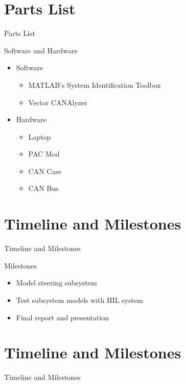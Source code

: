 \documentclass{beamer}
\begin{document}
\section{Parts List}

\begin{frame}{Parts List}
  \begin{block}{Software and Hardware}
 \begin{itemize}
        \item Software
        \begin{itemize}
        \small
        \item MATLAB's System Identification Toolbox
        \item Vector CANAlyzer
        \end{itemize}
	\item Hardware
	\begin{itemize}
	\small
	\item Laptop
	\item PAC Mod
	\item CAN Case 
	\item CAN Bus
	\end{itemize}
\end{itemize}
  \end{block}
\end{frame}

\section{Timeline and Milestones}

\begin{frame}{Timeline and Milestones}
  \begin{block}{Milestones}
 \begin{itemize}
        \item Model steering subsystem 
	\item Test subsystem models with HIL system 
	\item Final report and presentation 
\end{itemize}
  \end{block}
\end{frame}

\section{Timeline and Milestones}

\begin{frame}{Timeline and Milestones}
  
\end{frame}
\end{document}
